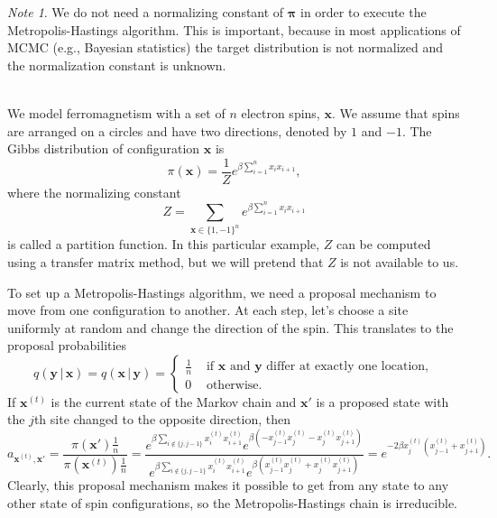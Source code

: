 \documentclass[11pt]{article}\usepackage[]{graphicx}\usepackage[]{color}
\numberwithin{algorithm}{section}
\theoremstyle{remark}
\newtheorem*{mynote}{Note}
\theoremstyle{definition}
\newenvironment{example}[1]{\begin{trivlist}
\item[\hskip \labelsep {\bfseries Example}: \underline{#1}]\ \\}{\end{trivlist}}
\begin{document}
\begin{mynote}
  We do not need a normalizing constant of $\boldsymbol{\pi}$ in order to
  execute the Metropolis-Hastings algorithm. This is important, because in most applications of MCMC (e.g., Bayesian statistics)
  the target distribution is not normalized and the normalization constant is unknown. 
\end{mynote}

\begin{example}{Toric Ising model on a circle}
  We model ferromagnetism with a set of $n$ electron spins, $\mathbf{x}$. We assume that spins are arranged on 
  a circles and have two directions, denoted by $1$ and $-1$. The Gibbs distribution of configuration $\mathbf{x}$
  is 
  \[
  \pi(\mathbf{x}) = \frac{1}{Z} e^{\beta \sum_{i=1}^n x_i x_{i+1}}, 
  \]
  where the normalizing constant 
  \[
  Z = \sum_{\mathbf{x} \in \{1,-1\}^n} e^{\beta \sum_{i=1}^n x_i x_{i+1}}
  \]
  is called a partition function. In this particular example, $Z$ can be computed using a transfer matrix method,
  but we will pretend that $Z$ is not available to us. 
  \par
  To set up a Metropolis-Hastings algorithm, we need a proposal mechanism to move from one configuration to 
  another. At each step, let's choose a site uniformly at random and change the direction of the spin. This 
  translates to the proposal probabilities
  \[
  q(\mathbf{y}\,|\,\mathbf{x}) =   q(\mathbf{x}\,|\,\mathbf{y}) = 
  \begin{cases}
    \frac{1}{n} &\text{ if } \mathbf{x} \text{ and } \mathbf{y} \text{ differ at exactly one location},\\
    0 & \text{ otherwise}.
  \end{cases}
  \]
  If $\mathbf{x}^{(t)}$ is the current state of the Markov chain and $\mathbf{x}'$ is a proposed state with 
  the $j$th site changed to the opposite direction, then 
  \[
  a_{\mathbf{x}^{(t)}, \mathbf{x}'} = \frac{\pi(\mathbf{x}')\frac{1}{n}}{\pi(\mathbf{x}^{(t)})\frac{1}{n}} = 
  \frac{e^{\beta \sum_{i \notin \{j,j-1\}} x_i^{(t)}x_{i+1}^{(t)}} e^{\beta (-x_{j-1}^{(t)}x_j^{(t)} -x_{j}^{(t)}x_{j+1}^{(t)})}}
  {e^{\beta \sum_{i \notin \{j,j-1\}} x_i^{(t)}x_{i+1}^{(t)}} e^{\beta (x_{j-1}^{(t)}x_j^{(t)} + x_{j}^{(t)}x_{j+1}^{(t)})}} = 
  e^{-2 \beta x_j^{(t)}(x_{j-1}^{(t)}+x_{j+1}^{(t)})}.
  \]
  Clearly, this proposal mechanism makes it possible to get from any state to any other state of spin 
  configurations, so the Metropolis-Hastings chain is irreducible.
\end{example}
\end{document}
